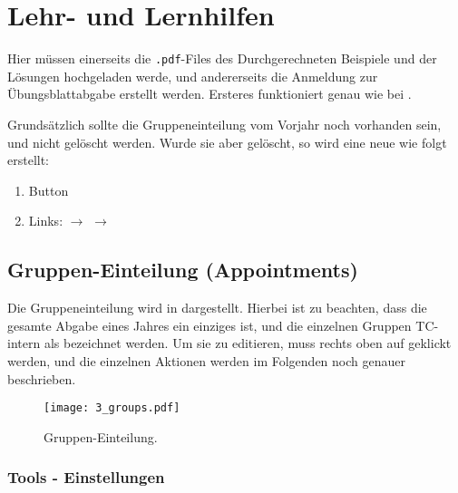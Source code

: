 \section{Lehr- und Lernhilfen}

Hier müssen einerseits die {\tt .pdf}-Files des Durchgerechneten Beispiele und
der Lösungen hochgeladen werde, und andererseits die Anmeldung zur 
Übungsblattabgabe erstellt werden. Ersteres funktioniert genau wie bei
.

Grundsätzlich sollte die Gruppeneinteilung vom Vorjahr noch vorhanden sein, und
nicht gelöscht werden. Wurde sie aber gelöscht, so wird eine neue wie folgt
erstellt:
\begin{enumerate}
\item Button 
\item Links:  $\to$ 
  $\to$ 
\end{enumerate}

\subsection{Gruppen-Einteilung (Appointments)}

Die Gruppeneinteilung wird in  dargestellt. Hierbei ist zu
beachten, dass die gesamte Abgabe eines Jahres ein einziges 
ist, und die einzelnen Gruppen TC-intern als  bezeichnet werden.
Um sie zu editieren, muss rechts oben auf  geklickt werden, und
die einzelnen Aktionen werden im Folgenden noch genauer beschrieben.

\begin{figure}[htbp]
\begin{center}
  \texttt{[image: 3\_groups.pdf]}
  \caption{ Gruppen-Einteilung.}
  \label{fig:groups}
\end{center}
\end{figure}

\subsubsection{Tools - Einstellungen}

